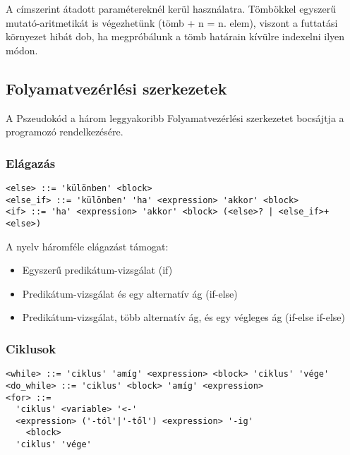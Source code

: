 A címszerint átadott paramétereknél kerül használatra. Tömbökkel egyszerű mutató-aritmetikát is végezhetünk (tömb + n = n. elem), viszont a futtatási környezet hibát dob, ha megpróbálunk a tömb határain kívülre indexelni ilyen módon.

\subsection{Folyamatvezérlési szerkezetek}

A Pszeudokód a három leggyakoribb Folyamatvezérlési szerkezetet bocsájtja a programozó rendelkezésére.

\subsubsection{Elágazás}

\begin{footnotesize}
\begin{verbatim}
<else> ::= 'különben' <block>
<else_if> ::= 'különben' 'ha' <expression> 'akkor' <block>
<if> ::= 'ha' <expression> 'akkor' <block> (<else>? | <else_if>+ <else>)
\end{verbatim}
\end{footnotesize}

A nyelv háromféle elágazást támogat: 

\begin{itemize}
  \item Egyszerű predikátum-vizsgálat (if)
  \item Predikátum-vizsgálat és egy alternatív ág (if-else)
  \item Predikátum-vizsgálat, több alternatív ág, és egy végleges ág (if-else if-else)
\end{itemize}

\subsubsection{Ciklusok}

\begin{footnotesize}
\begin{verbatim}
<while> ::= 'ciklus' 'amíg' <expression> <block> 'ciklus' 'vége'
<do_while> ::= 'ciklus' <block> 'amíg' <expression>
<for> ::= 
  'ciklus' <variable> '<-' 
  <expression> ('-tól'|'-től') <expression> '-ig'
    <block> 
  'ciklus' 'vége'
\end{verbatim}
\end{footnotesize}

